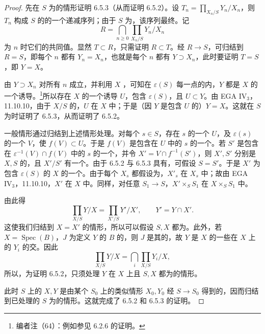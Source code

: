 \begin{proof}
先在 $S$ 为的情形证明 6.5.3（从而证明 6.5.2）。设 $T_n=\prod_{X_n/S}Y_n/X_n$，则 $T_n$ 构成 $S$ 的的一个递减序列；由于 $S$ 为，该序列最终。记
\[
R=\bigcap_{n\geq0}\prod_{X_n/S}Y_n/X_n
\]
为 $n$ 时它们的共同值。显然 $T\subset R$，只需证明 $R\subset T$。经 $R\to S$，可归结到 $R=S$，即每个 $n$ 都有 $Y_n=X_n$，也就是每个 $n$ 都有 $Y\supset X_n$，此时要证明 $T=S$，即 $Y=X$。

由 $Y\supset X_n$ 对所有 $n$ 成立，并利用 $X$ ，可知在 $\varepsilon(S)$ 每一点的内，$Y$ 都是 $X$ 的一个诱导。\footnote{编者注（64）：例如参见 6.2.6 的证明。}所以存在 $X$ 的一个诱导 $U$，包含 $\varepsilon(S)$，且 $U\subset Y$。由 EGA $\mathrm{IV}_3$，11.10.10，由于 $X/S$ 的，$U$ 在 $X$ 中；于是（因 $Y$ 是包含 $U$ 的）$Y=X$。这就在 $S$ 为时证明了 6.5.3，从而证明了 6.5.2。

一般情形通过归结到上述情形处理。对每个 $s\in S$，存在 $s$ 的一个 $U$，及 $\varepsilon(s)$ 的一个 $V$，使 $f(V)\subset U$。于是 $f(V)$ 是包含在 $U$ 中的 $s$ 的一个。若 $S'$ 是包含在 $\varepsilon^{-1}(V)\cap f(V)$ 中的 $s$ 的一个，并令 $X'=V\cap f^{-1}(S')$，则 $X',S'$ 分别是 $X,S$ 的，且 $X'/S'$ 有一个。由于 6.5.2 与 6.5.3 具有，可假设 $S=S'$。于是 $X'$ 为包含 $\varepsilon(S)$ 的 $X$ 的一个。由于每个 $X_s$ 都假设为，$X'_s$ 在 $X_s$ 中；故由 EGA $\mathrm{IV}_3$，11.10.10，$X'$ 在 $X$ 中。同样，对任意 $S_1\to S$，$X'\times_S S_1$ 在 $X\times_S S_1$ 中。

由此得
\[
\prod_{X/S}Y/X=\prod_{X'/S}Y'/X',\qquad Y'=Y\cap X'.
\]
这使我们归结到 $X=X'$ 的情形，所以可以假设 $S,X$ 都为。此外，若 $X=\operatorname{Spec}(B)$，$J$ 为定义 $Y$ 的 $B$ 的，则 $J$ 是其的，故 $Y$ 是 $X$ 的一些在 $X$ 上的 $Y_i$ 的交。因此
\[
\prod_{X/S}Y/X=\bigcap_i\prod_{X/S}Y_i/X,
\]
所以，为证明 6.5.2，只须处理 $Y$ 在 $X$ 上且 $S,X$ 都为的情形。

此时 $S$ 上的 $X,Y$ 是由某个 $S_0$ 上的类似情形 $X_0,Y_0$ 经 $S\to S_0$ 得到的，因而归结到已处理的 $S$ 为的情形。这就完成了 6.5.2 和 6.5.3 的证明。
\end{proof}

